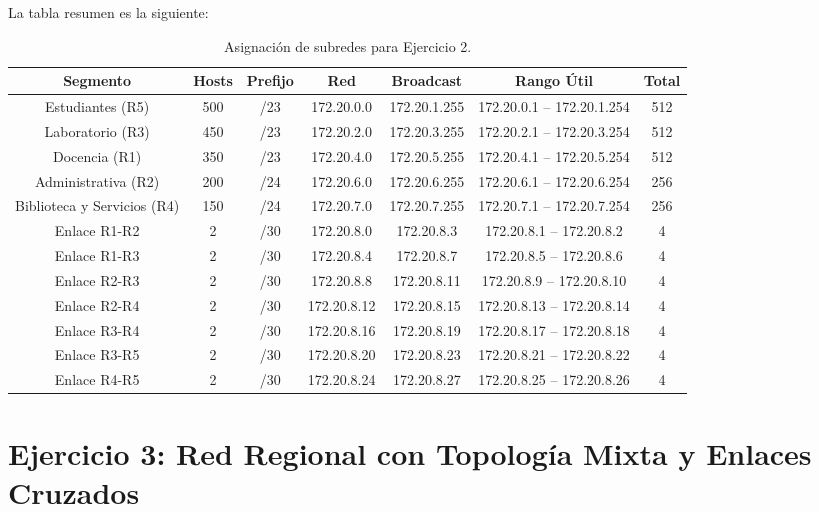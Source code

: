 \documentclass[a4paper,12pt]{article}
\begin{document}
La tabla resumen es la siguiente:

\begin{table}[H]
\centering
\begin{tabular}{|c|c|c|c|c|c|c|}
\hline
\textbf{Segmento} & \textbf{Hosts} & \textbf{Prefijo} & \textbf{Red} & \textbf{Broadcast} & \textbf{Rango Útil} & \textbf{Total} \\
\hline
Estudiantes (R5) & 500 & /23 & 172.20.0.0 & 172.20.1.255 & 172.20.0.1 -- 172.20.1.254 & 512 \\
\hline
Laboratorio (R3) & 450 & /23 & 172.20.2.0 & 172.20.3.255 & 172.20.2.1 -- 172.20.3.254 & 512 \\
\hline
Docencia (R1) & 350 & /23 & 172.20.4.0 & 172.20.5.255 & 172.20.4.1 -- 172.20.5.254 & 512 \\
\hline
Administrativa (R2) & 200 & /24 & 172.20.6.0 & 172.20.6.255 & 172.20.6.1 -- 172.20.6.254 & 256 \\
\hline
Biblioteca y Servicios (R4) & 150 & /24 & 172.20.7.0 & 172.20.7.255 & 172.20.7.1 -- 172.20.7.254 & 256 \\
\hline
Enlace R1-R2 & 2 & /30 & 172.20.8.0 & 172.20.8.3 & 172.20.8.1 -- 172.20.8.2 & 4 \\
\hline
Enlace R1-R3 & 2 & /30 & 172.20.8.4 & 172.20.8.7 & 172.20.8.5 -- 172.20.8.6 & 4 \\
\hline
Enlace R2-R3 & 2 & /30 & 172.20.8.8 & 172.20.8.11 & 172.20.8.9 -- 172.20.8.10 & 4 \\
\hline
Enlace R2-R4 & 2 & /30 & 172.20.8.12 & 172.20.8.15 & 172.20.8.13 -- 172.20.8.14 & 4 \\
\hline
Enlace R3-R4 & 2 & /30 & 172.20.8.16 & 172.20.8.19 & 172.20.8.17 -- 172.20.8.18 & 4 \\
\hline
Enlace R3-R5 & 2 & /30 & 172.20.8.20 & 172.20.8.23 & 172.20.8.21 -- 172.20.8.22 & 4 \\
\hline
Enlace R4-R5 & 2 & /30 & 172.20.8.24 & 172.20.8.27 & 172.20.8.25 -- 172.20.8.26 & 4 \\
\hline
\end{tabular}
\caption{Asignación de subredes para Ejercicio 2.}
\end{table}

\newpage
\section{Ejercicio 3: Red Regional con Topología Mixta y Enlaces Cruzados}
\end{document}
